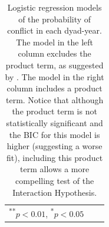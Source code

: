 \documentclass[12pt]{article}
\begin{document}
\begin{appendix}
\begin{table}[H]
\begin{center}
\begin{footnotesize}
\begin{tabular}{l c c }
{{  \textsuperscript{**}$p<0.01$, 
  \textsuperscript{*}$p<0.05$}}
\end{tabular}
\end{footnotesize}
\caption{Logistic regression models of the probability of conflict in each dyad-year. The model in the left column excludes the product term, as suggested by \cite{BerryDeMerittEsarey2010}. The model in the right column includes a product term. Notice that although the product term is not statistically significant and the BIC for this model is higher (suggesting a worse fit), including this product term allows a more compelling test of the Interaction Hypothesis.}
\label{tab:coefficients}
\end{center}
\end{table}

\singlespace

%


\end{appendix}
\end{document}
